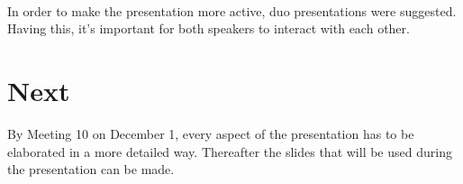 \documentclass[a4paper, 12pt]{article}
\begin{document}
\\
In order to make the presentation more active, duo presentations were suggested. Having this, it's important for both speakers to interact with each other. 


\section{Next}

By Meeting 10 on December 1, every aspect of the presentation has to be elaborated in a more detailed way. Thereafter the slides that will be used during the presentation can be made.

		
\end{document}
